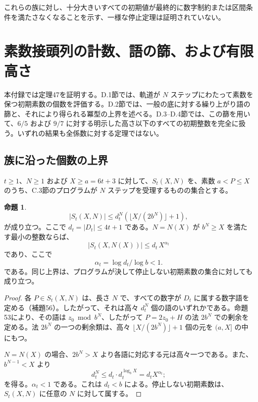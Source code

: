 \documentclass[11pt,reqno]{amsart}
\theoremstyle{definition}
\newtheorem{proposition}[theorem]{命題}
\theoremstyle{definition}
\theoremstyle{remark}
\begin{document}
これらの族に対し、十分大きいすべての初期値が最終的に数字制約または区間条件を満たさなくなることを示す、一様な停止定理は証明されていない。

\section{素数接頭列の計数、語の篩、および有限高さ}\label{app:D}

本付録では定理47を証明する。D.1節では、軌道が \(N\) ステップにわたって素数を保つ初期素数の個数を評価する。D.2節では、一般の底に対する繰り上がり語の篩と、それにより得られる冪型の上界を述べる。D.3--D.4節では、この篩を用いて、\(6/5\) および \(9/7\) に対する明示した高さ以下のすべての初期整数を完全に扱う。いずれの結果も全係数に対する定理ではない。

\subsection{族に沿った個数の上界}\label{sec:D.1}

\(t\ge1\)、\(N\ge1\) および \(X\ge a=6t+3\) に対して、\(S_t(X,N)\) を、素数 \(a<P\le X\) のうち、C.3節のプログラムが \(N\) ステップを受理するものの集合とする。

\begin{samepage}
\begin{proposition}\leavevmode\label{thm:63}
\[
|S_t(X,N)|\le d_t^N(\lfloor X/(2b^N)\rfloor+1),
\]
が成り立つ。ここで \(d_t=|D_t|\le4t+1\) である。\(N=N(X)\) が
\(b^N\ge X\) を満たす最小の整数ならば、
\[
|S_t(X,N(X))|\le d_t\,X^{\alpha_t}
\]
であり、ここで
\[
\alpha_t=\log d_t/\log b<1.
\]
である。同じ上界は、プログラムが決して停止しない初期素数の集合に対しても成り立つ。
\label{thm-end:63}
\end{proposition}
\end{samepage}

\begin{proof}\leavevmode\label{proof:63}
各 \(P\in S_t(X,N)\) は、長さ \(N\) で、すべての数字が \(D_t\) に属する数字語を定める（補題56）。したがって、それは高々 \(d_t^N\) 個の語のいずれかである。命題53により、その語は \(z_0\bmod b^N\)、したがって \(P=2z_0+H\) の法 \(2b^N\) での剰余を定める。法 \(2b^N\) の一つの剰余類は、高々 \(\lfloor X/(2b^N)\rfloor+1\) 個の元を \((a,X]\) の中にもつ。

\(N=N(X)\) の場合、\(2b^N>X\) より各語に対応する元は高々一つである。また、\(b^{N-1}<X\) より
\[
d_t^N\le d_t\cdot d_t^{\log_bX}
=d_tX^{\alpha_t};
\]
を得る。\(\alpha_t<1\) である。これは \(d_t<b\) による。停止しない初期素数は、\(S_t(X,N)\) に任意の \(N\) に対して属する。\qedhere
\end{proof}
\end{document}
